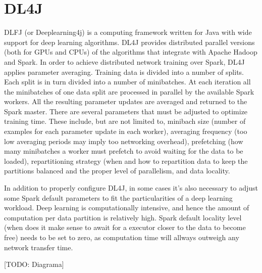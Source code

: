 \documentclass[journal]{IEEEtran}
\begin{document}
\section{DL4J}
\label{sec:spark}
DLFJ (or Deeplearning4j) is a computing framework written for Java with wide support for deep learning algorithms. DL4J provides distributed parallel versions (both for GPUs and CPUs) of the algorithms that integrate with Apache Hadoop and Spark. In order to achieve distributed network training over Spark, DL4J applies parameter averaging. Training data is divided into a number of splits. Each split is in turn divided into a number of minibatches. At each iteration all the minibatches of one data split are processed in parallel by the available Spark workers. All the resulting parameter updates are averaged and returned to the Spark master. There are several parameters that must be adjusted to optimize training time. These include, but are not limited to, minibach size (number of examples for each parameter update in each worker), averaging frequency (too low averaging periods may imply too networking overhead), prefetching (how many minibatches a worker must prefetch to avoid waiting for the data to be loaded), repartitioning strategy (when and how to repartition data to keep the partitions balanced and the proper level of parallelism, and data locality. 

In addition to properly configure DL4J, in some cases it's also necessary to adjust some Spark default parameters to fit the particularities of a deep learning workload. Deep learning is computationally intensive, and hence the amount of computation per data partition is relatively high. Spark default locality level (when does it make sense to await for a executor closer to the data to become free) needs to be set to zero, as computation time will allways outweigh any network transfer time.  

[TODO: Diagrama]
\end{document}
